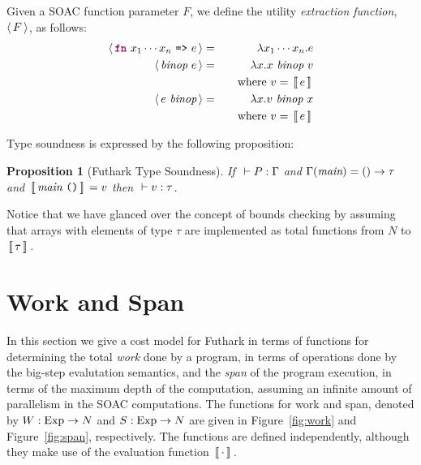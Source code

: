 \documentclass[oneside,11pt]{book}
\newtheorem{proposition}{Proposition}
\begin{document}
Given a SOAC function parameter $F$, we define the utility \emph{extraction function}, $\langle\,F\,\rangle$, as follows:
\begin{eqnarray*}
  \extractF{\fw{fn}~x_1\cdots x_n~\kw{=>}~ e} & = & \lambda x_1 \cdots x_n . e \\
  \extractF{\id{binop}~e} & = & \lambda x . x~\id{binop}~v \\
    & & ~~~\mathrm{where}~v = \Eval{e} \\
  \extractF{e~\id{binop}} & = & \lambda x . v~\id{binop}~x \\
    & & ~~~\mathrm{where}~v = \Eval{e}
\end{eqnarray*}

Type soundness is expressed by the following proposition:

\begin{proposition}[Futhark Type Soundness]
  If $~\vdash P : \Gamma$ and $\Gamma(\mbox{\it{main}}) = () \rightarrow \tau$ and
  $\,[\![\,\mbox{\it{main}}~\texttt{()}\,]\!]\, = v$ then $~\vdash v : \tau$.
\end{proposition}

Notice that we have glanced over the concept of bounds checking by
assuming that arrays with elements of type $\tau$ are implemented as
total functions from $N$ to $\,[\![\,\tau\,]\!]\,$.

\section{Work and Span}

In this section we give a cost model for Futhark in terms of functions
for determining the total \emph{work} done by a program, in terms of
operations done by the big-step evalutation semantics, and the
\emph{span} of the program execution, in terms of the maximum depth of
the computation, assuming an infinite amount of parallelism in the
SOAC computations. The functions for work and span, denoted by $W :
\mathrm{Exp} \rightarrow N$ and $S : \mathrm{Exp} \rightarrow N$ are
given in Figure~\ref{fig:work} and Figure~\ref{fig:span}, respectively. The functions are defined
independently, although they make use of the evaluation function
$\,[\![\,\cdot\,]\!]\,$.
\end{document}
